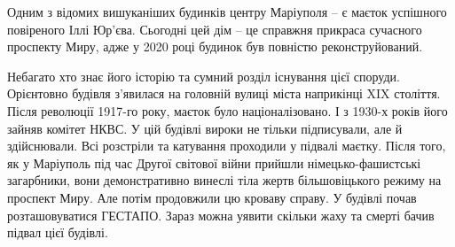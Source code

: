 
Одним з відомих вишуканіших будинків центру Маріуполя – є маєток успішного
повіреного Іллі Юр'єва. Сьогодні цей дім – це справжня прикраса сучасного
проспекту Миру, адже у 2020 році будинок був повністю реконструйований.

Небагато хто знає його історію та сумний розділ існування цієї споруди.
Орієнтовно будівля з'явилася на головній вулиці міста наприкінці XIX століття.
Після революції 1917-го року, маєток було націоналізовано. І з 1930-х років
його зайняв комітет НКВС. У цій будівлі вироки не тільки підписували, але й
здійснювали. Всі розстріли та катування проходили у підвалі маєтку. Після того,
як у Маріуполь під час Другої світової війни прийшли німецько-фашистські
загарбники, вони демонстративно винеслі тіла жертв більшовіцького режиму на
проспект Миру. Але потім продовжили цю кроваву справу. У будівлі почав
розташовуватися ГЕСТАПО. Зараз можна уявити скільки жаху та смерті бачив підвал
цієї будівлі.

